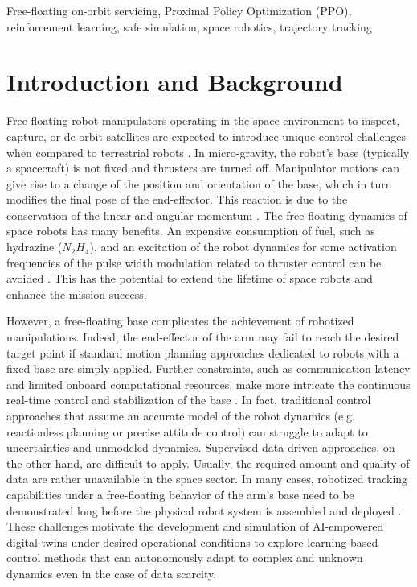 \documentclass{ieeeaccess}
\begin{document}
\begin{keywords}
Free-floating on-orbit servicing, Proximal Policy Optimization (PPO), reinforcement learning, safe simulation, space robotics,  trajectory tracking
\end{keywords}

\titlepgskip=-15pt

\maketitle

\section{Introduction and Background}

Free-floating robot manipulators operating in the space environment to inspect, capture, or de-orbit  satellites are expected to
introduce unique control challenges when compared to terrestrial robots \cite{b1}. 
In micro-gravity, the robot’s base (typically a spacecraft) is not fixed and thrusters are turned off. 
Manipulator motions can give rise to a change of the position and orientation of the base, 
which in turn modifies the final pose of the end-effector. This reaction is due to the conservation of 
the linear and angular momentum \cite{b6}. The free-floating dynamics of space robots has many benefits. 
An expensive consumption of fuel, such as hydrazine ($N_2H_4$),  and  an excitation of the robot dynamics for some activation 
frequencies of the pulse width modulation related to thruster control can be avoided \cite{b11}. This has the potential to extend the lifetime of space robots and enhance the mission success.

However, a free-floating base complicates the achievement of robotized manipulations. 
Indeed, the end-effector of the arm may fail to reach the desired target point if standard motion planning approaches dedicated to robots with a 
fixed base are simply applied. Further constraints, such as communication latency 
and limited onboard computational resources, make more intricate the continuous real-time control and stabilization of the base \cite{b1,b32}. In fact, traditional control
approaches that assume an accurate model of the robot dynamics (e.g. reactionless planning or precise attitude control) 
can struggle to adapt to uncertainties and unmodeled dynamics. Supervised data-driven approaches, on the other hand, are difficult to apply. 
Usually, the required amount and quality of data are rather unavailable in the space sector. 
In many cases, robotized tracking capabilities under a free-floating behavior of the arm's base need to be 
demonstrated long before the physical robot system is assembled and deployed \cite{muhlbauer2025software,rybus2024robotic,kaigom2011optimal}.  
These challenges motivate the development and simulation of AI-empowered digital twins \cite{kaigom2025deep} under desired operational conditions to
explore learning-based control methods that can autonomously adapt to complex and unknown dynamics  even in the case of data scarcity.
\end{document}
